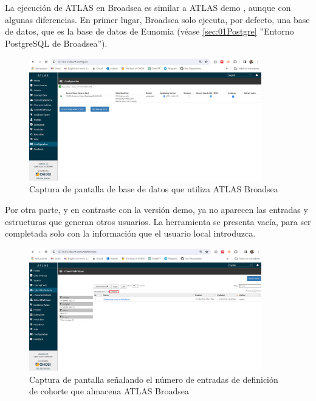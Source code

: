 
    La ejecución de ATLAS en Broadsea es similar a ATLAS demo \cite{atlasDEMO}, aunque con algunas diferencias. En primer lugar, Broadsea solo ejecuta, por defecto, una base de datos, que es la base de datos de Eunomia (véase \ref{sec:01Postgre} ''Entorno PostgreSQL de Broadsea'').

\begin{figure}[H]
    \centering
    \includegraphics[width=0.90\textwidth]{figures/atlasBroadseaDB.png}
     \caption{Captura de pantalla de base de datos que utiliza ATLAS Broadsea}
    \label{fig:atlasBroadseaDB}
\end{figure}

    Por otra parte, y en contraste con la versión demo, ya no aparecen las entradas y estructuras que generan otros usuarios. La herramienta se presenta vacía, para ser completada solo con la información que el usuario local introduzca.

\begin{figure}[H]
    \centering
    \includegraphics[width=0.90\textwidth]{figures/atlasBroadseaCD.png}
     \caption{Captura de pantalla señalando el número de entradas de definición de cohorte que almacena ATLAS Broadsea}
    \label{fig:atlasBroadseaCD}
\end{figure}
    

